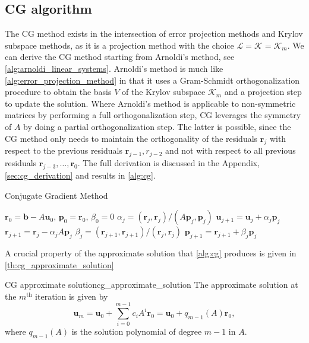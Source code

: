 \subsection{CG algorithm}
The CG method exists in the intersection of error projection methods and Krylov subspace methods, as it is a projection method with the choice $\mathcal{L} = \mathcal{K} = \mathcal{K}_m$. We can derive the CG method starting from Arnoldi's method, see \cref{alg:arnoldi_linear_systems}. Arnoldi's method is much like \cref{alg:error_projection_method} in that it uses a Gram-Schmidt orthogonalization procedure to obtain the basis $V$ of the Krylov subspace $\mathcal{K}_m$ and a projection step to update the solution. Where Arnoldi's method is applicable to non-symmetric matrices by performing a full orthogonalization step, CG leverages the symmetry of $A$ by doing a partial orthogonalization step. The latter is possible, since the CG method only needs to maintain the orthogonality of the residuals $\mathbf{r}_j$ with respect to the previous residuals $\mathbf{r}_{j-1}, r_{j-2}$ and not with respect to all previous residuals $\mathbf{r}_{j-3}, \dots, \mathbf{r}_0$. The full derivation is discussed in the Appendix, \cref{sec:cg_derivation} and results in \cref{alg:cg}.
\begin{algorithm}[H]
  \caption{Conjugate Gradient Method}
  \begin{algorithmic}
    \State $\mathbf{r}_0 = \mathbf{b} - A\mathbf{u}_0$, $\mathbf{p}_0 = \mathbf{r}_0$, $\beta_0 = 0$
    \State $\alpha_j = (\mathbf{r}_j, \mathbf{r}_j) / (A \mathbf{p}_j, \mathbf{p}_j)$
    \State $\mathbf{u}_{j+1} = \mathbf{u}_j + \alpha_j \mathbf{p}_j$
    \State $\mathbf{r}_{j+1} = \mathbf{r}_j - \alpha_j A \mathbf{p}_j$
    \State $\beta_j = (\mathbf{r}_{j+1}, \mathbf{r}_{j+1}) / (\mathbf{r}_j, \mathbf{r}_j)$
    \State $\mathbf{p}_{j+1} = \mathbf{r}_{j+1} + \beta_j \mathbf{p}_j$
    \EndFor
  \end{algorithmic}
  \label{alg:cg}
\end{algorithm}
A crucial property of the approximate solution that \cref{alg:cg} produces is given in \cref{th:cg_approximate_solution}
\begin{fancyth}{CG approximate solution}{cg_approximate_solution}
  The approximate solution at the $m^{\text{th}}$ iteration is given by
  \begin{equation}
    \mathbf{u}_m = \mathbf{u}_0 + \sum_{i=0}^{m-1} c_i A^i \mathbf{r}_0 = \mathbf{u}_0 + q_{m-1}(A)\mathbf{r}_0,
    \label{eq:cg_approximate_solution}
  \end{equation}
  where $q_{m-1}(A)$ is the solution polynomial of degree $m-1$ in $A$.
\end{fancyth}
